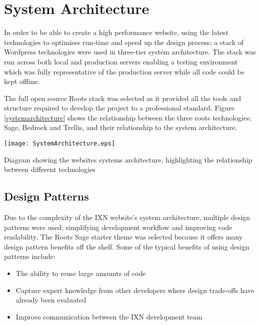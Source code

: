\documentclass[fontsize=11pt]{extarticle}
\numberwithin{figure}{section} %
\numberwithin{table}{section}%
\providecommand{\tightlist}{%
  \setlength{\itemsep}{0pt}\setlength{\parskip}{0pt}}
\begin{document}
\newpage

\hypertarget{system-architecture}{%
\section{System Architecture}\label{system-architecture}}

In order to be able to create a high performance website, using the
latest technologies to optimises run-time and speed up the design
process; a stack of Wordpress technologies were used in three-tier
system architecture. The stack was run across both local and production
servers enabling a testing environment which was fully representative of
the production server while all code could be kept offline.

The full open source Roots stack \cite{rootsweb} was selected as it
provided all the tools and structure required to develop the project to
a professional standard. Figure \ref{systemarchitecture} shows the
relationship between the three roots technologies; Sage, Bedrock and
Trellis, and their relationship to the system architecture.

\begin{table}[H]
\centering
\texttt{[image: SystemArchitecture.eps]}
\caption{Diagram showing the websites systems architecture, highlighting the relationship between different technologies}
\label{systemarchitecture}
\end{table}

\hypertarget{design-patterns}{%
\subsection{Design Patterns}\label{design-patterns}}

Due to the complexity of the IXN website's system architecture, multiple
design patterns were used; simplifying development workflow and
improving code readability. The Roots Sage starter theme was selected
because it offers many design pattern benefits off the shelf. Some of
the typical benefits of using design patterns include:

\begin{itemize}
\tightlist
\item
  The ability to reuse large amounts of code \cite{deanDesignPatterns}
\item
  Capture expert knowledge from other developers where design trade-offs
  have already been evaluated
\item
  Improve communication between the IXN development team
\end{itemize}
\end{document}
